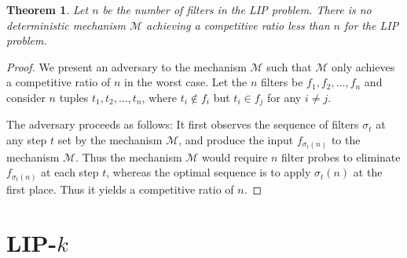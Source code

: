 \documentclass[10pt]{article}
\newtheorem{theorem}{Theorem}[section]
\begin{document}
\begin{theorem}
	Let $n$ be the number of filters in the LIP problem. There is no deterministic mechanism $\mathcal{M}$ achieving a competitive ratio less than $n$ for the \textsc{LIP} problem.
\end{theorem}

\begin{proof}
	We present an adversary to the mechanism $\mathcal{M}$ such that $\mathcal{M}$ only achieves a competitive ratio of $n$ in the worst case. Let the $n$ filters be $f_1, f_2, \dots, f_n$ and consider $n$ tuples $t_1, t_2, \dots, t_n$, where $t_i \notin f_i$ but $t_i \in f_j$ for any $i \neq j$.

	The adversary proceeds as follows: It first observes the sequence of filters $\sigma_t$ at any step $t$ set by the mechanism $\mathcal{M}$, and produce the input $f_{\sigma_t(n)}$ to the mechanism $\mathcal{M}$. Thus the mechanism $\mathcal{M}$ would require $n$ filter probes to eliminate $f_{\sigma_t(n)}$ at each step $t$, whereas the optimal sequence is to apply $\sigma_t(n)$ at the first place. Thus it yields a competitive ratio of $n$.
\end{proof}



\section{LIP-$k$}

\end{document}
